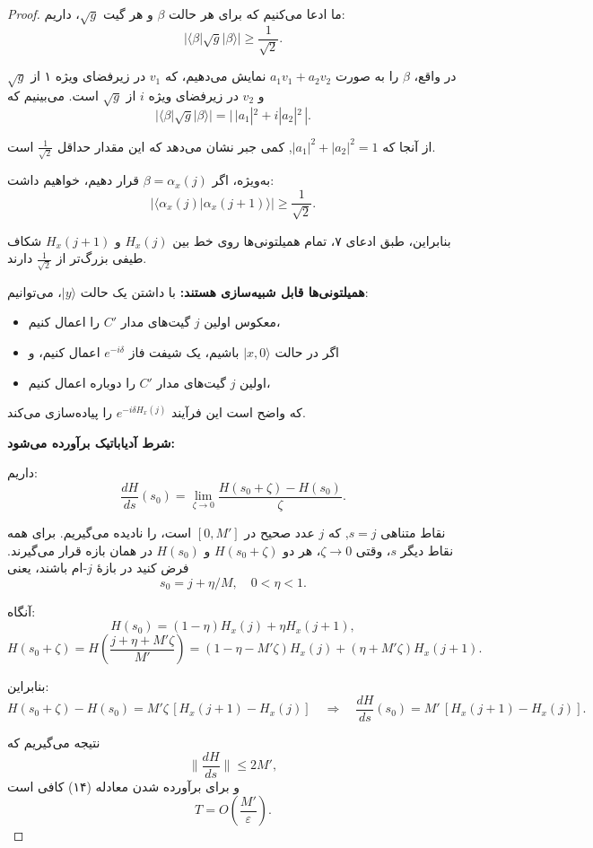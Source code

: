 \begin{proof}
 ما ادعا می‌کنیم که برای هر حالت $\beta$ و هر گیت $\sqrt{g}$، داریم:  
 \[
 |\langle \beta|\sqrt{g}|\beta\rangle| \ge \frac{1}{\sqrt{2}}.
 \]  
 
 در واقع، $\beta$ را به صورت $a_1 v_1 + a_2 v_2$ نمایش می‌دهیم، که $v_1$ در زیرفضای ویژه ۱ از $\sqrt{g}$ و $v_2$ در زیرفضای ویژه $i$ از $\sqrt{g}$ است. می‌بینیم که  
 \[
 |\langle \beta|\sqrt{g}|\beta\rangle| = |\,|a_1|^2 + i |a_2|^2 \,|.
 \]  
 
 از آنجا که $|a_1|^2 + |a_2|^2 = 1$, کمی جبر نشان می‌دهد که این مقدار حداقل $\frac{1}{\sqrt{2}}$ است.  
 
 به‌ویژه، اگر $\beta = \alpha_x(j)$ قرار دهیم، خواهیم داشت:  
 \[
 |\langle \alpha_x(j)|\alpha_x(j+1)\rangle| \ge \frac{1}{\sqrt{2}}.
 \]  
 
 بنابراین، طبق ادعای ۷، تمام همیلتونی‌ها روی خط بین $H_x(j)$ و $H_x(j+1)$ شکاف طیفی بزرگ‌تر از $\frac{1}{\sqrt{2}}$ دارند.
 
 \textbf{همیلتونی‌ها قابل شبیه‌سازی هستند:}  
 با داشتن یک حالت $|y\rangle$، می‌توانیم:  
 
 \begin{itemize}
 	\item معکوس اولین $j$ گیت‌های مدار $C'$ را اعمال کنیم،  
 	\item اگر در حالت $|x,0\rangle$ باشیم، یک شیفت فاز $e^{-i\delta}$ اعمال کنیم، و  
 	\item اولین $j$ گیت‌های مدار $C'$ را دوباره اعمال کنیم،  
 \end{itemize}
 
 که واضح است این فرآیند $e^{-i\delta H_x(j)}$ را پیاده‌سازی می‌کند.
 
 \textbf{شرط آدیاباتیک برآورده می‌شود:}  
 
 داریم:  
 \[
 \frac{dH}{ds}(s_0) = \lim_{\zeta \to 0} \frac{H(s_0 + \zeta) - H(s_0)}{\zeta}.
 \]  
 
 نقاط متناهی $s = j$, که $j$ عدد صحیح در $[0, M']$ است، را نادیده می‌گیریم. برای همه نقاط دیگر $s$، وقتی $\zeta \to 0$، هر دو $H(s_0 + \zeta)$ و $H(s_0)$ در همان بازه قرار می‌گیرند. فرض کنید در بازهٔ $j$-ام باشند، یعنی  
 \[
 s_0 = j + \eta / M, \quad 0 < \eta < 1.
 \]  
 
 آنگاه:  
 \[
 H(s_0) = (1 - \eta) H_x(j) + \eta H_x(j+1),
 \]  
\[H({s_0} + \zeta ) = H(\frac{{j + \eta  + M'\zeta }}{{M'}}) = (1 - \eta  - M'\zeta ){H_x}(j) + (\eta  + M'\zeta ){H_x}(j + 1).\] 
 
 بنابراین:  
 \[
 H(s_0 + \zeta) - H(s_0) = M' \zeta \, [H_x(j+1) - H_x(j)] \quad \Rightarrow \quad \frac{dH}{ds}(s_0) = M' \,[H_x(j+1) - H_x(j)].
 \]  
 
 نتیجه می‌گیریم که  
 \[
 \Big\|\frac{dH}{ds}\Big\| \le 2 M',
 \]  
 و برای برآورده شدن معادله (۱۴) کافی است  
\[T = O(\frac{{M'}}{\varepsilon}).\] 
 \end{proof}
